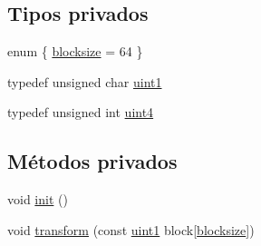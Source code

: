 \subsection*{Tipos privados}
\begin{DoxyCompactItemize}
\item 
enum \{ \hyperlink{classMD5_a227e6f16f2409956b516b453e6bc7429a1cc0a742ca803f75a021aef77b522963}{blocksize} = 64
 \}
\item 
typedef unsigned char \hyperlink{classMD5_a3b1c4901139aef256ee49c4ab14d09f9}{uint1}
\item 
typedef unsigned int \hyperlink{classMD5_a2e5b84a3d7db292f49873061214a0444}{uint4}
\end{DoxyCompactItemize}
\subsection*{Métodos privados}
\begin{DoxyCompactItemize}
\item 
void \hyperlink{classMD5_a65ddaecdd0bd0b09043a2f3b2601bc2e}{init} ()
\item 
void \hyperlink{classMD5_a9d569ab2a3e564793e116f774a3ad269}{transform} (const \hyperlink{classMD5_a3b1c4901139aef256ee49c4ab14d09f9}{uint1} block\mbox{[}\hyperlink{classMD5_a227e6f16f2409956b516b453e6bc7429a1cc0a742ca803f75a021aef77b522963}{blocksize}\mbox{]})
\end{DoxyCompactItemize}
